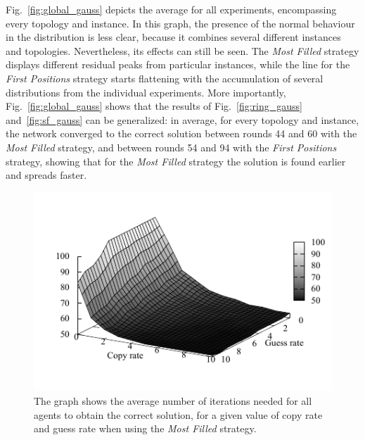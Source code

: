 \documentclass{article}
\begin{document}
Fig.~\ref{fig:global_gauss} depicts the average for all experiments, encompassing every topology and instance. In this graph, the presence of the normal behaviour in the distribution is less clear, because it combines several different instances and topologies. Nevertheless, its effects can still be seen. The \emph{Most Filled} strategy displays different residual peaks from particular instances, while the line for the \emph{First Positions} strategy starts flattening with the accumulation of several distributions from the individual experiments. More importantly, 
Fig.~\ref{fig:global_gauss} shows that the results of Fig.~\ref{fig:ring_gauss} and~\ref{fig:sf_gauss} can be generalized: in average, for every topology and instance, the network converged to the correct solution between rounds 44 and 60 with the \emph{Most Filled} strategy, and between rounds 54 and 94 with the \emph{First Positions} strategy, showing that for the \emph{Most Filled} strategy the solution is found earlier and spreads faster.

\begin{figure}
\includegraphics[scale=1]{ijcai_sudoku/fill_iter}
\caption{The graph shows the average number of iterations needed for all agents to obtain the correct solution, for a given value of copy rate and guess rate when using the \emph{Most Filled} strategy.
}
\label{fig:fill_iter}
\end{figure}
\end{document}
